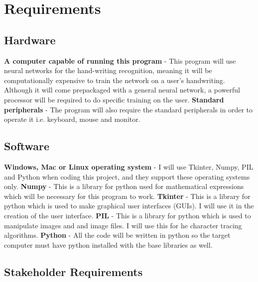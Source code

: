 \documentclass{report}
\begin{document}
\newpage

\section{Requirements}
\subsection{Hardware}
\textbf{A computer capable of running this program} - This program will use neural networks for the hand-writing recognition, meaning it will be computationally expensive to train the network on a user's handwriting. Although it will come prepackaged with a general neural network, a powerful processor will be required to do specific training on the user.
\newline
\newline
\textbf{Standard peripherals} - The program will also require the standard peripherals in order to operate it i.e. keyboard, mouse and monitor.
\subsection{Software}
\textbf{Windows, Mac or Linux operating system} - I will use Tkinter, Numpy, PIL and Python when coding this project, and they support these operating systems only.
\newline
\newline
\textbf{Numpy} - This is a library for python used for mathematical expressions which will be necessary for this program to work.
\newline
\newline
\textbf{Tkinter} - This is a library for python which is used to make graphical user interfaces (GUIs). I will use it in the creation of the user interface.
\newline
\newline
\textbf{PIL} - This is a library for python which is used to manipulate images and and image files. I will use this for he character tracing algorithms.
\newline
\newline
\textbf{Python} - All the code will be written in python so the target computer must have python installed with the base libraries as well.

\subsection{Stakeholder Requirements}
\end{document}

